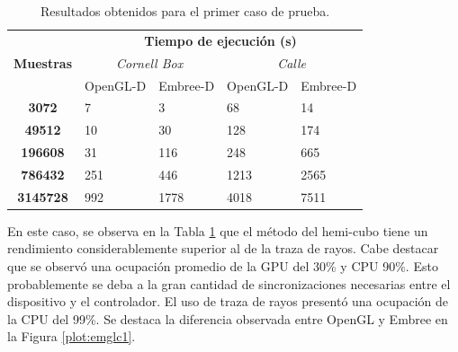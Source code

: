 \begin{table}[htbp]
	\centering
	\begin{tabular}{|c|l|l|l|l|}
		\hline
		\multirow{3}{*}{\textbf{Muestras}} & \multicolumn{4}{c|}{\textbf{Tiempo de ejecución (s)}}                                                                                  \\ \cline{2-5} 
		& \multicolumn{2}{c|}{\textit{Cornell Box}}                 & \multicolumn{2}{c|}{\textit{Calle}}                      \\ \cline{2-5} 
		& \multicolumn{1}{c|}{OpenGL-D} & \multicolumn{1}{c|}{Embree-D} & \multicolumn{1}{c|}{OpenGL-D} & \multicolumn{1}{c|}{Embree-D} \\ \hline
		\textbf{3072}                        & 7                           & 3                           & 68                          & 14                          \\ \hline
		\textbf{49512}                       & 10                          & 30                          & 128                         & 174                         \\ \hline
		\textbf{196608}                       & 31                          & 116                         & 248                         & 665                         \\ \hline
		\textbf{786432}   & 251                         & 446                         & 1213                        & 2565                        \\ \hline
		\textbf{3145728}                      & 992                         & 1778                        & 4018                        & 7511                        \\ \hline
	\end{tabular}
	\caption{Resultados obtenidos para el primer caso de prueba.}
	\label{tab:tablecaso1}
\end{table}

En este caso, se observa en la Tabla \ref{tab:tablecaso1} que el método del hemi-cubo tiene un rendimiento considerablemente superior al de la traza de rayos. Cabe destacar que se observó una ocupación promedio de la GPU del 30\% y CPU 90\%. Esto probablemente se deba a la gran cantidad de sincronizaciones necesarias entre el dispositivo y el controlador. El uso de traza de rayos presentó una ocupación de la CPU del 99\%. Se destaca la diferencia observada entre OpenGL y Embree en la Figura \ref{plot:emglc1}.


